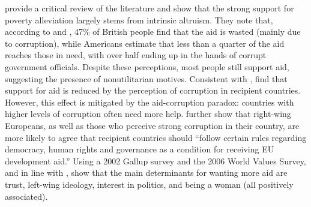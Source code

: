 \citet{hudson_mile_2012} provide a critical review of the literature and show that the strong support for poverty alleviation largely stems from intrinsic altruism. They note that, according to \citet{dfid_aid_2009} and \citet{pipa_americans_2001}, 47\% of British people find that the aid is wasted (mainly due to corruption), while Americans estimate that less than a quarter of the aid reaches those in need, with over half ending up in the hands of corrupt government officials. Despite these perceptions, most people still support aid, suggesting the presence of nonutilitarian motives. Consistent with \citet{henson_public_2010}, \citet{bauhr_does_2013} find that support for aid is reduced by the perception of corruption in recipient countries. However, this effect is mitigated by the aid-corruption paradox: countries with higher levels of corruption often need more help. %
\citet{bodenstein_who_2017} further show that right-wing Europeans, as well as those who perceive strong corruption in their country, are more likely to agree that recipient countries should ``follow certain rules regarding democracy, human rights and governance as a condition for receiving EU development aid.'' 
Using a 2002 Gallup survey and the 2006 World Values Survey, and in line with \citet{bayram_aiding_2017}, \citet{paxton_individual_2012} show that the main determinants for wanting more aid are trust, left-wing ideology, interest in politics, and being a woman (all positively associated).  %

